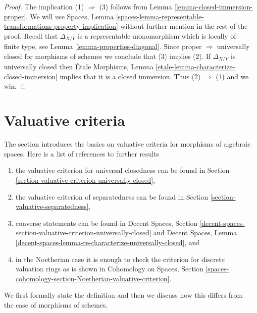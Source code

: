\begin{proof}
The implication (1) $\Rightarrow$ (3) follows from
Lemma \ref{lemma-closed-immersion-proper}.
We will use
Spaces, Lemma
\ref{spaces-lemma-representable-transformations-property-implication}
without further mention in the rest of the proof.
Recall that $\Delta_{X/Y}$ is a representable
monomorphism which is locally of finite type, see
Lemma \ref{lemma-properties-diagonal}.
Since proper $\Rightarrow$ universally closed for morphisms of schemes
we conclude that (3) implies (2).
If $\Delta_{X/Y}$ is universally closed then
\'Etale Morphisms,
Lemma \ref{etale-lemma-characterize-closed-immersion}
implies that it is a closed immersion. Thus (2) $\Rightarrow$ (1)
and we win.
\end{proof}





\section{Valuative criteria}
\label{section-valuative}

\noindent
The section introduces the basics on valuative criteria for morphisms
of algebraic spaces. Here is a list of references to further results
\begin{enumerate}
\item the valuative criterion for universal closedness can be found in
Section \ref{section-valuative-criterion-universally-closed},
\item the valuative criterion of separatedness can be found in
Section \ref{section-valuative-separatedness},
\item converse statements can be found in
Decent Spaces, Section
\ref{decent-spaces-section-valuative-criterion-universally-closed}
and Decent Spaces, Lemma
\ref{decent-spaces-lemma-re-characterize-universally-closed}, and
\item in the Noetherian case it is enough to check the criterion for
discrete valuation rings as is shown in Cohomology on Spaces, Section
\ref{spaces-cohomology-section-Noetherian-valuative-criterion}.
\end{enumerate}
We first formally state the definition and then we discuss how this
differs from the case of morphisms of schemes.


